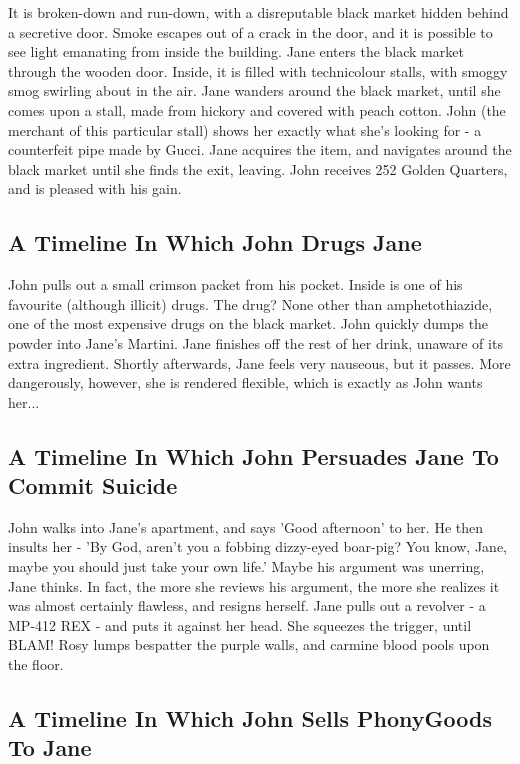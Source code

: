 \documentclass{article}
\begin{document}
It is broken{-}down and run{-}down, with a disreputable black market hidden behind a secretive door.
Smoke escapes out of a crack in the door, and it is possible to see light emanating from inside the building.
Jane enters the black market through the wooden door.
Inside, it is filled with technicolour stalls, with smoggy smog swirling about in the air.
Jane wanders around the black market, until she comes upon a stall, made from hickory and covered with peach cotton.
John (the merchant of this particular stall) shows her exactly what she's looking for {-} a counterfeit pipe made by Gucci.
Jane acquires the item, and navigates around the black market until she finds the exit, leaving.
John receives 252 Golden Quarters, and is pleased with his gain.
\subsection{A Timeline In Which John Drugs Jane}


John pulls out a small crimson packet from his pocket. Inside is one of his favourite (although illicit) drugs.
The drug? None other than amphetothiazide, one of the most expensive drugs on the black market.
John quickly dumps the powder into Jane's Martini.
Jane finishes off the rest of her drink, unaware of its extra ingredient.
Shortly afterwards, Jane feels very nauseous, but it passes.
More dangerously, however, she is rendered flexible, which is exactly as John wants her...
\subsection{A Timeline In Which John Persuades Jane To Commit Suicide}


John walks into Jane's apartment, and says 'Good afternoon' to her.
He then insults her {-} 'By God, aren't you a fobbing dizzy{-}eyed boar{-}pig?
You know, Jane, maybe you should just take your own life.'
Maybe his argument was unerring, Jane thinks.
In fact, the more she reviews his argument, the more she realizes it was almost certainly flawless, and resigns herself.
Jane pulls out a revolver {-} a MP{-}412 REX {-} and puts it against her head.
She squeezes the trigger, until BLAM!
Rosy lumps bespatter the purple walls, and carmine blood pools upon the floor.
\subsection{A Timeline In Which John Sells PhonyGoods To Jane}
\end{document}
